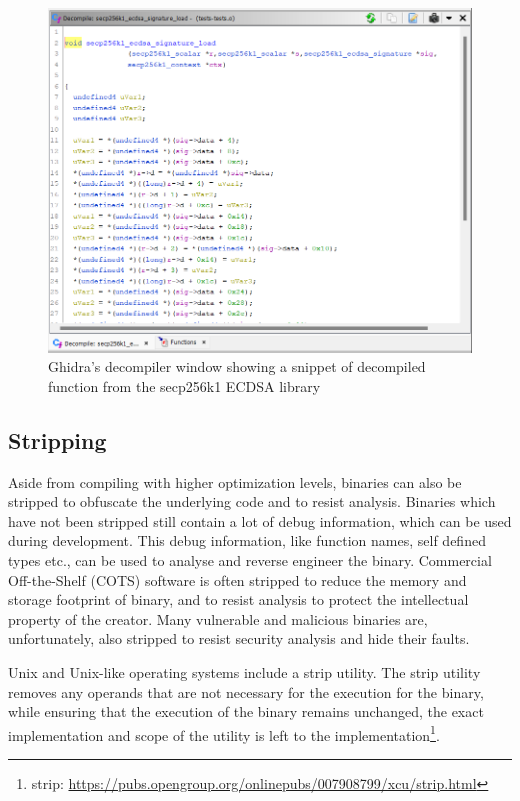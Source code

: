 \label{fig:decompiler}
\begin{figure}[!h]
  \centering
  \includegraphics[width=\linewidth]{img/decompiler.png}
  \caption{Ghidra's decompiler window showing a snippet of decompiled function from the secp256k1 ECDSA library}
\end{figure}
\newpage
\subsection{Stripping}
Aside from compiling with higher optimization levels, binaries can also be stripped to obfuscate the underlying code and to resist analysis\cite{StochFuzz}. Binaries which have not been stripped still contain a lot of debug information, which can be used during development. This debug information, like function names, self defined types etc., can be used to analyse and reverse engineer the binary. Commercial Off-the-Shelf (COTS) software is often stripped to reduce the memory and storage footprint of binary, and to resist analysis to protect the intellectual property of the creator. Many vulnerable and malicious binaries are, unfortunately, also stripped to resist security analysis and hide their faults\cite{Debin}.

Unix and Unix-like operating systems include a strip utility. The strip utility removes any operands that are not necessary for the execution for the binary, while ensuring that the execution of the binary remains unchanged, the exact implementation and scope of the utility is left to the implementation\footnote{strip: \url{https://pubs.opengroup.org/onlinepubs/007908799/xcu/strip.html}}. 

